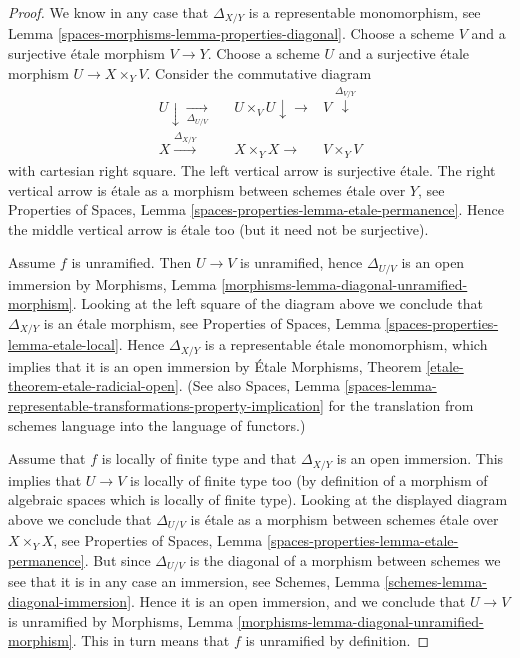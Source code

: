 \begin{proof}
We know in any case that $\Delta_{X/Y}$ is a representable monomorphism, see
Lemma \ref{spaces-morphisms-lemma-properties-diagonal}.
Choose a scheme $V$ and a surjective \'etale morphism $V \to Y$.
Choose a scheme $U$ and a surjective \'etale morphism $U \to X \times_Y V$.
Consider the commutative diagram
$$
\begin{array}{cccc}U \downarrow\underset{\Delta_{U/V}}{\longrightarrow} &  & U \times_V U \downarrow\longrightarrow & V \overset{\Delta_{V/Y}}{\downarrow} \\ X \overset{\Delta_{X/Y}}{\longrightarrow} &  & X \times_Y X \longrightarrow & V \times_Y V\end{array}
$$
with cartesian right square. The left vertical arrow is surjective \'etale.
The right vertical arrow is \'etale as a morphism between schemes
\'etale over $Y$, see
Properties of Spaces,
Lemma \ref{spaces-properties-lemma-etale-permanence}.
Hence the middle vertical arrow is \'etale too (but it need not be
surjective).

\medskip\noindent
Assume $f$ is unramified. Then $U \to V$ is unramified, hence
$\Delta_{U/V}$ is an open immersion by
Morphisms, Lemma \ref{morphisms-lemma-diagonal-unramified-morphism}.
Looking at the left square of the diagram above we conclude that
$\Delta_{X/Y}$ is an \'etale morphism, see
Properties of Spaces,
Lemma \ref{spaces-properties-lemma-etale-local}.
Hence $\Delta_{X/Y}$ is a representable \'etale monomorphism, which
implies that it is an open immersion by
\'Etale Morphisms, Theorem \ref{etale-theorem-etale-radicial-open}.
(See also
Spaces, Lemma
\ref{spaces-lemma-representable-transformations-property-implication}
for the translation from schemes language into the language of functors.)

\medskip\noindent
Assume that $f$ is locally of finite type and that $\Delta_{X/Y}$
is an open immersion. This implies that $U \to V$ is locally of finite
type too (by definition of a morphism of algebraic spaces which is
locally of finite type). Looking at the displayed diagram above
we conclude that $\Delta_{U/V}$ is \'etale as a morphism between
schemes \'etale over $X \times_Y X$, see
Properties of Spaces,
Lemma \ref{spaces-properties-lemma-etale-permanence}.
But since $\Delta_{U/V}$ is the diagonal of a morphism between schemes
we see that it is in any case an immersion, see
Schemes, Lemma \ref{schemes-lemma-diagonal-immersion}.
Hence it is an open immersion, and we conclude
that $U \to V$ is unramified by
Morphisms, Lemma \ref{morphisms-lemma-diagonal-unramified-morphism}.
This in turn means that $f$ is unramified by definition.
\end{proof}

